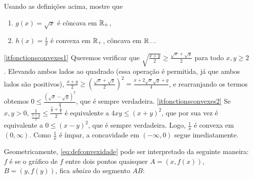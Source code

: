 \begin{exo}
Usando as definições acima, mostre que 
\begin{enumerate}
\item\label{itfonctionsconvexes1} $g(x)=\sqrt{x}$ é côncava em $\mathbb{R}_+$,
\item\label{itfonctionsconvexes2} $h(x)=\frac{1}{x}$ é convexa em $\mathbb{R}_+$,
côncava em $\mathbb{R}_-$.
\end{enumerate}
\begin{sol}
\eqref{itfonctionsconvexes1} Queremos verificar que $\sqrt{\frac{x+y}{2}}\geq
\frac{\sqrt{x}+\sqrt{y}}{2}$ para todo $x,y\geq 2$.
Elevando ambos lados ao quadrado (essa operação é permitida, já que ambos
lados são positivos), $\frac{x+y}{2}\geq
(\frac{\sqrt{x}+\sqrt{y}}{2})^2
=\frac{x+2\sqrt{x}\sqrt{y}+y}{4}$, e rearranjando os termos obtemos $0\leq
\frac{(\sqrt{x}-\sqrt{y})^2}{4}$, que é sempre verdadeira.
\eqref{itfonctionsconvexes2}
Se $x,y>0$, $\frac{1}{\frac{x+y}{2}}\leq \frac{\frac{1}{x}+\frac{1}{y}}{2}$ é
equivalente a $4xy\leq (x+y)^2$, que por sua vez é equivalente a $0\leq
(x-y)^2$, que é sempre verdadeira. Logo, $\frac1x$ é convexa em $(0,\infty)$.
Como $\frac1x$ é ímpar, a concavidade em $(-\infty,0)$ segue imediatamente.
\end{sol}
\end{exo}

Geometricamente, \eqref{eq:defconvexidade} pode ser interpretado da seguinte
maneira:
$f$ é  se o gráfico de $f$ entre dois pontos quaisquer
$A=(x,f(x))$, $B=(y,f(y))$, fica \emph{abaixo} do segmento $AB$:
\begin{center}
\begin{bmlimage}\end{bmlimage}
\end{center}

